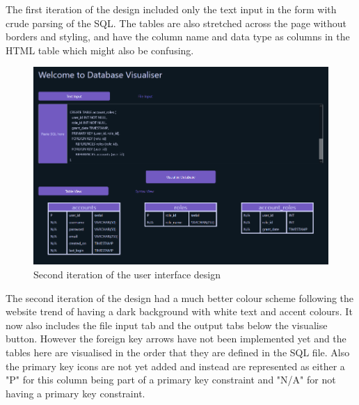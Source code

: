 The first iteration of the design included only the text input in the form with crude parsing of the SQL. The tables are also stretched across the page without borders and styling, and have the column name and data type as columns in the HTML table which might also be confusing.

\newpage

\begin{figure}[h!]
	\centering
	\includegraphics[width=\textwidth]{secondDesign}
	\caption{Second iteration of the user interface design}
	\label{fig:secondDesign}
\end{figure}

The second iteration of the design had a much better colour scheme following the website trend of having a dark background with white text and accent colours. It now also includes the file input tab and the output tabs below the visualise button. However the foreign key arrows have not been implemented yet and the tables here are visualised in the order that they are defined in the SQL file. Also the primary key icons are not yet added and instead are represented as either a "P" for this column being part of a primary key constraint and "N/A" for not having a primary key constraint.

\newpage

